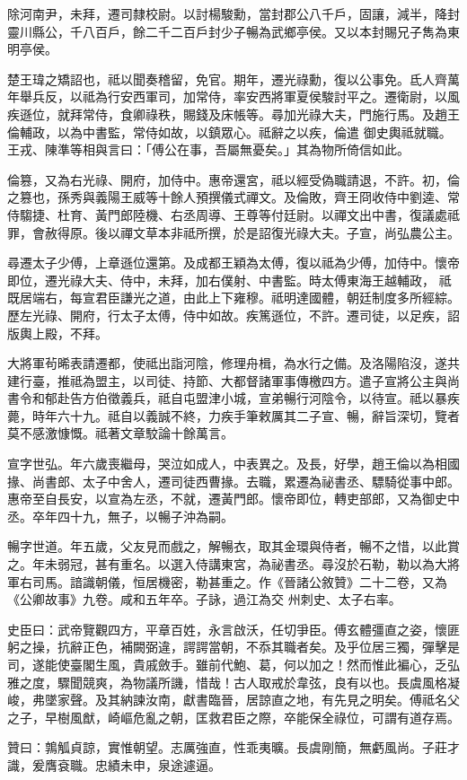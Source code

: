 \begin{pinyinscope}
 除河南尹，未拜，遷司隸校尉。以討楊駿勳，當封郡公八千戶，固讓，減半，降封靈川縣公，千八百戶，餘二千二百戶封少子暢為武鄉亭侯。又以本封賜兄子雋為東明亭侯。



 楚王瑋之矯詔也，祗以聞奏稽留，免官。期年，遷光祿勳，復以公事免。氐人齊萬年舉兵反，以祗為行安西軍司，加常侍，率安西將軍夏侯駿討平之。遷衛尉，以風疾遜位，就拜常侍，食卿祿秩，賜錢及床帳等。尋加光祿大夫，門施行馬。及趙王倫輔政，以為中書監，常侍如故，以鎮眾心。祗辭之以疾，倫遣
 御史輿祗就職。王戎、陳準等相與言曰：「傅公在事，吾屬無憂矣。」其為物所倚信如此。



 倫篡，又為右光祿、開府，加侍中。惠帝還宮，祗以經受偽職請退，不許。初，倫之篡也，孫秀與義陽王威等十餘人預撰儀式禪文。及倫敗，齊王冏收侍中劉逵、常侍騶捷、杜育、黃門郎陸機、右丞周導、王尊等付廷尉。以禪文出中書，復議處祗罪，會赦得原。後以禪文草本非祗所撰，於是詔復光祿大夫。子宣，尚弘農公主。



 尋遷太子少傅，上章遜位還第。及成都王穎為太傅，復以祗為少傅，加侍中。懷帝即位，遷光祿大夫、侍中，未拜，加右僕射、中書監。時太傅東海王越輔政，
 祗既居端右，每宣君臣謙光之道，由此上下雍穆。祗明達國體，朝廷制度多所經綜。歷左光祿、開府，行太子太傅，侍中如故。疾篤遜位，不許。遷司徒，以足疾，詔版輿上殿，不拜。



 大將軍茍晞表請遷都，使祗出詣河陰，修理舟楫，為水行之備。及洛陽陷沒，遂共建行臺，推祗為盟主，以司徒、持節、大都督諸軍事傳檄四方。遣子宣將公主與尚書令和郁赴告方伯徵義兵，祗自屯盟津小城，宣弟暢行河陰令，以待宣。祗以暴疾薨，時年六十九。祗自以義誠不終，力疾手筆敕厲其二子宣、暢，辭旨深切，覽者莫不感激慷慨。祗著文章駮論十餘萬言。



 宣字世弘。年六歲喪繼母，哭泣如成人，中表異之。及長，好學，趙王倫以為相國掾、尚書郎、太子中舍人，遷司徒西曹掾。去職，累遷為祕書丞、驃騎從事中郎。惠帝至自長安，以宣為左丞，不就，遷黃門郎。懷帝即位，轉吏部郎，又為御史中丞。卒年四十九，無子，以暢子沖為嗣。



 暢字世道。年五歲，父友見而戲之，解暢衣，取其金環與侍者，暢不之惜，以此賞之。年未弱冠，甚有重名。以選入侍講東宮，為祕書丞。尋沒於石勒，勒以為大將軍右司馬。諳識朝儀，恒居機密，勒甚重之。作《晉諸公敘贊》二十二卷，又為《公卿故事》九卷。咸和五年卒。子詠，過江為交
 州刺史、太子右率。



 史臣曰：武帝覽觀四方，平章百姓，永言啟沃，任切爭臣。傅玄體彊直之姿，懷匪躬之操，抗辭正色，補闕弼違，諤諤當朝，不忝其職者矣。及乎位居三獨，彈擊是司，遂能使臺閣生風，貴戚斂手。雖前代鮑、葛，何以加之！然而惟此褊心，乏弘雅之度，驟聞競爽，為物議所譏，惜哉！古人取戒於韋弦，良有以也。長虞風格凝峻，弗墜家聲。及其納諫汝南，獻書臨晉，居諒直之地，有先見之明矣。傅祗名父之子，早樹風猷，崎嶇危亂之朝，匡救君臣之際，卒能保全祿位，可謂有道存焉。



 贊曰：鶉觚貞諒，實惟朝望。志厲強直，性乖夷曠。長虞剛簡，無虧風尚。子莊才識，爰膺袞職。忠績未申，泉途遽逼。



\end{pinyinscope}